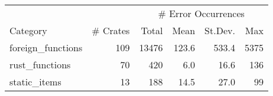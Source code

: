 \begin{table}[ht]
\centering
\begin{tabular}{lrrrrr}
  \hline
  & & \multicolumn{4}{c}{# Error Occurrences} \\
 Category & # Crates & Total & Mean & St.Dev. & Max \\
 \hline
foreign\_functions & 109 & 13476 & 123.6 & 533.4 & 5375 \\ 
  rust\_functions & 70 & 420 & 6.0 & 16.6 & 136 \\ 
  static\_items & 13 & 188 & 14.5 & 27.0 & 99 \\ 
   \hline
\end{tabular}
\end{table}
